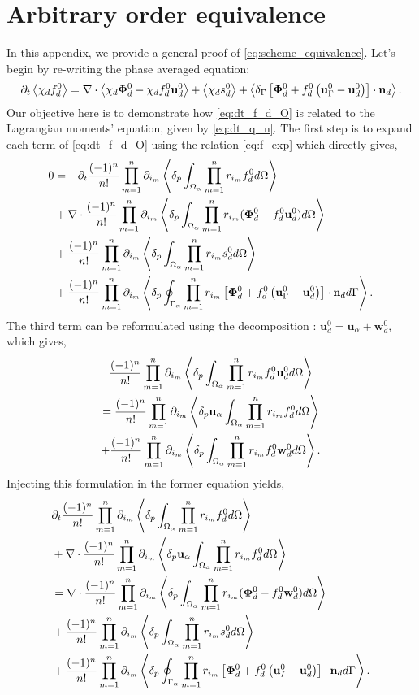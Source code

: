\section{Arbitrary order equivalence}
\label{ap:equivalence}
In this appendix, we provide a general proof of \ref{eq:scheme_equivalence}. 
Let's begin by re-writing the phase averaged equation:
\begin{equation}
        \pddt \avg{\chi_d f_d^0}
        = \div \avg{\chi_d \bm\Phi_d^0 - \chi_d f_d^0 \textbf{u}_d^0}
        + \avg{\chi_d s_d^0}
        + \avg{\delta_\Gamma\left[
            \bm\Phi_d^0
            + f_d^0
            \left(
                \textbf{u}_\Gamma^0
                - \textbf{u}_d^0
            \right)
        \right]
        \cdot \textbf{n}_d}.
        \label{eq:dt_f_d_O}
\end{equation}
Our objective here is to demonstrate how \ref{eq:dt_f_d_O} is related to the Lagrangian moments' equation, given by \ref{eq:dt_q_n}. 
The first step is to expand each term of \ref{eq:dt_f_d_O} using the relation \ref{eq:f_exp} which directly gives,
\begin{align*}
        0 &=
        - \partial_t \frac{(-1)^{n}}{{n}!} \prod_{m=1}^{n} \partial_{i_m} \left<\delta_{p} \int_{\Omega_{\alpha}}  \prod_{m=1}^{n} r_{i_m}f_d^0  d\Omega\right> \\
        &+\mathbf{\nabla}\cdot \frac{(-1)^{n}}{{n}!} \prod_{m=1}^{n} \partial_{i_m} \left<\delta_{p} \int_{\Omega_{\alpha}}  \prod_{m=1}^{n} r_{i_m}(\bm\Phi_d^0  - f_d^0 \textbf{u}_d^0)  d\Omega\right>\\
        &+ \frac{(-1)^{n}}{{n}!} \prod_{m=1}^{n} \partial_{i_m} \left<\delta_{p} \int_{\Omega_{\alpha}}  \prod_{m=1}^{n} r_{i_m} s_d^0  d\Omega\right>\\
        &+ \frac{(-1)^n}{n!} \prod_{m=1}^{n} \partial_{i_m} \left<\delta_{p} \oint_{\Gamma_{\alpha}} \prod_{m=1}^{n} r_{i_m}\left[
            \bm\Phi_d^0
            + f_d^0
            \left(
                \textbf{u}_\Gamma^0
                - \textbf{u}_d^0
            \right)
        \right]
        \cdot \textbf{n}_d  d\Gamma\right>. \\
\end{align*}
The third term can be reformulated using the decomposition : $\textbf{u}_d^0 = \textbf{u}_\alpha + \textbf{w}_d^0$, which gives,
\begin{multline}
    \frac{(-1)^{n}}{{n}!} \prod_{m=1}^{n} \partial_{i_m} \left<\delta_{p} \int_{\Omega_{\alpha}}  \prod_{m=1}^{n} r_{i_m}f_d^0 \textbf{u}_d^0  d\Omega\right>\\
    =     \frac{(-1)^n}{n!} \prod_{m=1}^{n} \partial_{i_m} \left<\delta_{p} \textbf{u}_\alpha\int_{\Omega_{\alpha}}  \prod_{m=1}^{n} r_{i_m}f_d^0   d\Omega\right>\\
    +     \frac{(-1)^{n}}{{n}!} \prod_{m=1}^{n} \partial_{i_m} \left<\delta_{p} \int_{\Omega_{\alpha}}  \prod_{m=1}^{n} r_{i_m}f_d^0 \textbf{w}_d^0  d\Omega\right>.
\end{multline}
Injecting this formulation in the former equation yields,
\begin{align}
    & \pddt \expo{f_d^0} \\
    &+ \div \expoU{f_d^0}\\
    &= \div \expo{(\bm\Phi_d^0 - f_d^0 \textbf{w}_d^0)}\\
    &+ \expo{ s_d^0}\\
    &+ \expoS{\left[
        \bm\Phi_d^0
        + f_d^0 
        \left(
            \textbf{u}_I^0
            - \textbf{u}_d^0
        \right)
    \right]
    \cdot \textbf{n}_d}. \\
    \label{eq:nearly_done}
\end{align}
